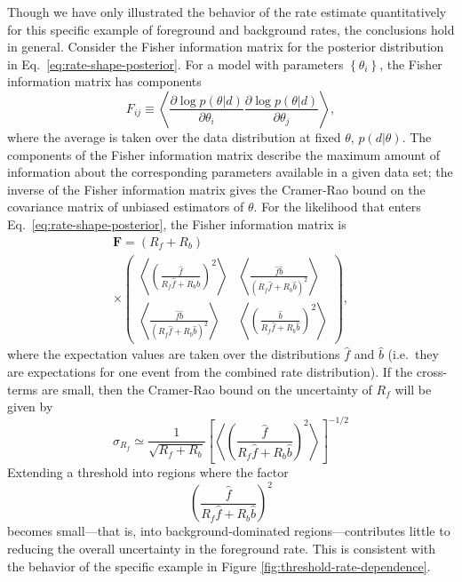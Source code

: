 \documentclass[aps,prd,reprint,nofootinbib]{revtex4-1}
\newcommand{\mathset}[1]{\left\{ #1 \right\}}
\begin{document}
Though we have only illustrated the behavior of the rate estimate
quantitatively for this specific example of foreground and background
rates, the conclusions hold in general.  Consider the Fisher
information matrix for the posterior distribution in
Eq.~\eqref{eq:rate-shape-posterior}.  For a model with parameters
$\mathset{\theta_i}$, the Fisher information matrix has components
\begin{equation}
  F_{ij} \equiv \left\langle \frac{\partial \log p\left( \theta | d
    \right)}{\partial \theta_i} \frac{\partial \log p\left( \theta | d
    \right)}{\partial \theta_j} \right\rangle,
\end{equation}
where the average is taken over the data distribution at fixed
$\theta$, $p(d | \theta)$.  The components of the Fisher information
matrix describe the maximum amount of information about the
corresponding parameters available in a given data set; the inverse of
the Fisher information matrix gives the Cramer-Rao bound on the
covariance matrix of unbiased estimators of $\theta$.  For the
likelihood that enters Eq.~\eqref{eq:rate-shape-posterior}, the Fisher
information matrix is 
\begin{multline}
  \mathbf{F} = \left( R_f + R_b \right) \\ \times \begin{pmatrix}
    \left \langle \left(\frac{\hat{f}}{R_f \hat{f} + R_b \hat{b}}\right)^2 \right
    \rangle & \left \langle \frac{\hat{f} \hat{b}}{\left( R_f \hat{f}
      + R_b \hat{b} \right)^2} \right\rangle \\
    \left \langle \frac{\hat{f} \hat{b}}{\left( R_f \hat{f}
      + R_b \hat{b} \right)^2} \right\rangle & \left \langle
    \left(\frac{\hat{b}}{R_f \hat{f} + R_b \hat{b}}\right)^2 \right 
    \rangle
  \end{pmatrix},
\end{multline}
where the expectation values are taken over the distributions
$\hat{f}$ and $\hat{b}$ (i.e.\ they are expectations for one event
from the combined rate distribution).  If the cross-terms are small,
then the Cramer-Rao bound on the uncertainty of $R_f$ will be given by
\begin{equation}
  \sigma_{R_f} \simeq \frac{1}{\sqrt{R_f + R_b}} \left[ \left\langle \left(
    \frac{\hat{f}}{R_f \hat{f} + R_b \hat{b}} \right)^2 \right\rangle\right]^{-1/2}
\end{equation}
Extending a threshold into regions where the factor 
\begin{equation}
  \left( \frac{\hat{f}}{R_f \hat{f} + R_b \hat{b}} \right)^2
\end{equation}
becomes small---that is, into background-dominated
regions---contributes little to reducing the overall uncertainty in the
foreground rate.  This is consistent with the behavior of the specific
example in Figure \ref{fig:threshold-rate-dependence}.
\end{document}

